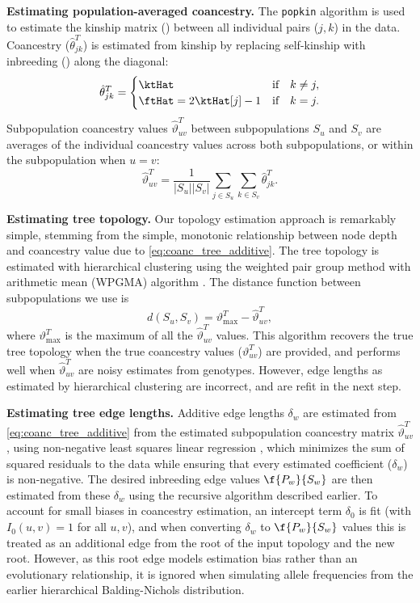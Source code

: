 \documentclass[11pt]{article}
\begin{document}
\textbf{Estimating population-averaged coancestry.}
The \texttt{popkin} algorithm is used to estimate the kinship matrix (\ktHat) between all individual pairs ($j,k$) in the data.
Coancestry ($\hat{\theta}_{jk}^T$) is estimated from kinship by replacing self-kinship with inbreeding (\ftHat) along the diagonal:
\begin{equation}
  \label{eq:kinship_to_coanc}
  \hat{\theta}_{jk}^T
  =
  \begin{cases}
    \ktHat & \text{if} \quad k \ne j, \\
    \ftHat = 2 \ktHat[j] - 1 & \text{if} \quad k = j.
  \end{cases}
\end{equation}
Subpopulation coancestry values $\hat{\vartheta}_{uv}^T$ between subpopulations $S_u$ and $S_v$ are averages of the individual coancestry values across both subpopulations, or within the subpopulation when $u=v$:
$$
\hat{\vartheta}_{uv}^T
=
\frac{1}{|S_u||S_v|} \sum_{j \in S_u} \sum_{k \in S_v} \hat{\theta}_{jk}^T
.
$$

\textbf{Estimating tree topology.}
Our topology estimation approach is remarkably simple, stemming from the simple, monotonic relationship between node depth and coancestry value due to \cref{eq:coanc_tree_additive}.
The tree topology is estimated with hierarchical clustering using the weighted pair group method with arithmetic mean (WPGMA) algorithm \citep{sokal_statistical_1958}.
The distance function between subpopulations we use is
$$
d( S_u, S_v ) = \vartheta_\text{max}^T - \hat{\vartheta}_{uv}^T,
$$
where $\vartheta_\text{max}^T$ is the maximum of all the $\hat{\vartheta}_{uv}^T$ values.
This algorithm recovers the true tree topology when the true coancestry values ($\vartheta_{uv}^T$) are provided, and performs well when $\hat{\vartheta}_{uv}^T$ are noisy estimates from genotypes.
However, edge lengths as estimated by hierarchical clustering are incorrect, and are refit in the next step.

\textbf{Estimating tree edge lengths.}
Additive edge lengths $\delta_w$ are estimated from \cref{eq:coanc_tree_additive} from the estimated subpopulation coancestry matrix $\hat{\vartheta}_{uv}^T$, using non-negative least squares linear regression \citep{lawson_solving_1974}, which minimizes the sum of squared residuals to the data while ensuring that every estimated coefficient ($\delta_w$) is non-negative.
The desired inbreeding edge values $\f{P_w}{S_w}$ are then estimated from these $\delta_w$ using the recursive algorithm described earlier.
To account for small biases in coancestry estimation, an intercept term $\delta_0$ is fit (with $I_0(u,v) = 1$ for all $u,v$), and when converting $\delta_w$ to $\f{P_w}{S_w}$ values this is treated as an additional edge from the root of the input topology and the new root.
However, as this root edge models estimation bias rather than an evolutionary relationship, it is ignored when simulating allele frequencies from the earlier hierarchical Balding-Nichols distribution.
\end{document}
